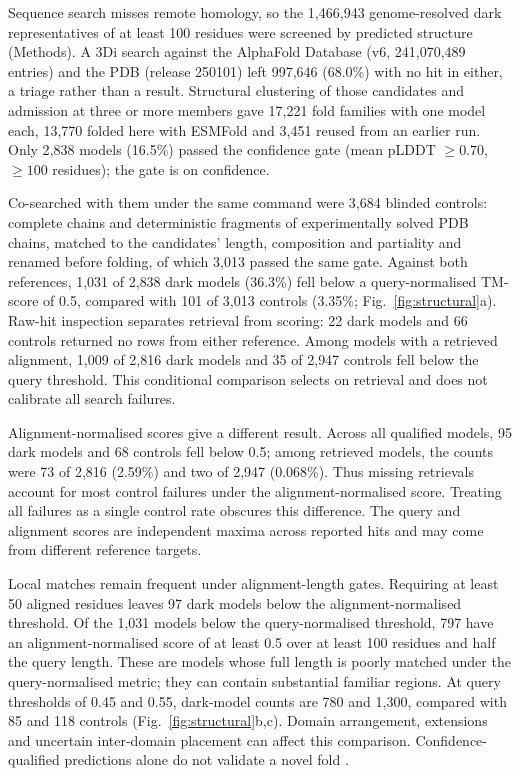 \documentclass[11pt]{article}
\begin{document}
Sequence search misses remote homology, so the 1{,}466{,}943 genome-resolved dark representatives
of at least 100 residues were screened by predicted structure (Methods). A 3Di search against the
AlphaFold Database (v6, 241{,}070{,}489 entries) and the PDB (release 250101) left 997{,}646
(68.0\%) with no hit in either, a triage rather than a result. Structural clustering of those
candidates and admission at three or more members gave 17{,}221 fold families with one model each,
13{,}770 folded here with ESMFold and 3{,}451 reused from an earlier run. Only 2{,}838 models
(16.5\%) passed the confidence gate (mean pLDDT $\geq 0.70$, $\geq 100$ residues); the gate is on
confidence.

Co-searched with them under the same command were 3{,}684 blinded controls: complete chains and
deterministic fragments of experimentally solved PDB chains, matched to the candidates' length,
composition and partiality and renamed before folding, of which 3{,}013 passed the same gate.
Against both references, 1{,}031 of 2{,}838 dark models (36.3\%) fell below a query-normalised
TM-score of 0.5, compared with 101 of 3{,}013 controls (3.35\%; Fig.~\ref{fig:structural}a).
Raw-hit inspection separates retrieval from scoring: 22 dark models and 66 controls returned
no rows from either reference. Among models with a retrieved alignment, 1{,}009 of 2{,}816 dark
models and 35 of 2{,}947 controls fell below the query threshold. This conditional comparison
selects on retrieval and does not calibrate all search failures.

Alignment-normalised scores give a different result. Across all qualified models, 95 dark
models and 68 controls fell below 0.5; among retrieved models, the counts were 73 of 2{,}816
(2.59\%) and two of 2{,}947 (0.068\%). Thus missing retrievals account for most control failures
under the alignment-normalised score. Treating all failures as a single control rate obscures
this difference. The query and alignment scores are independent maxima across reported hits
and may come from different reference targets.

Local matches remain frequent under alignment-length gates. Requiring at least 50 aligned
residues leaves 97 dark models below the alignment-normalised threshold. Of the 1{,}031 models
below the query-normalised threshold, 797 have an alignment-normalised score of at least 0.5
over at least 100 residues and half the query length. These are models whose full length is
poorly matched under the query-normalised metric; they can contain substantial familiar regions.
At query thresholds of 0.45 and 0.55, dark-model counts are 780 and 1{,}300, compared with 85
and 118 controls (Fig.~\ref{fig:structural}b,c). Domain arrangement, extensions and uncertain
inter-domain placement can affect this comparison. Confidence-qualified predictions alone do
not validate a novel fold \citep{orr2026spurious}.
\end{document}
